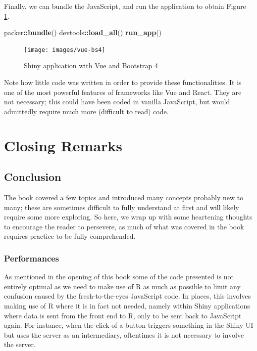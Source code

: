 \documentclass[10pt,]{krantz}
\makeatletter
\newenvironment{Shaded}{\begin{snugshade}}{\end{snugshade}}
\newcommand{\KeywordTok}[1]{\textcolor[rgb]{0.27,0.27,0.27}{\textbf{#1}}}
\newcommand{\NormalTok}[1]{#1}
\newcommand{\OperatorTok}[1]{\textcolor[rgb]{0.43,0.43,0.43}{\textbf{#1}}}
\newenvironment{kframe}{%
\medskip{}
\setlength{\fboxsep}{.8em}
 \def\at@end@of@kframe{}%
 \ifinner\ifhmode%
  \def\at@end@of@kframe{\end{minipage}}%
  \begin{minipage}{\columnwidth}%
 \fi\fi%
 \def\FrameCommand##1{\hskip\@totalleftmargin \hskip-\fboxsep
 \colorbox{shadecolor}{##1}\hskip-\fboxsep
     \hskip-\linewidth \hskip-\@totalleftmargin \hskip\columnwidth}%
 \MakeFramed {\advance\hsize-\width
   \@totalleftmargin\z@ \linewidth\hsize
   \@setminipage}}%
 {\par\unskip\endMakeFramed%
 \at@end@of@kframe}
\renewenvironment{Shaded}{\begin{kframe}}{\end{kframe}}
\makeatother
\begin{document}
Finally, we can bundle the JavaScript, and run the application to obtain Figure \ref{fig:vue-bs4}.

\begin{Shaded}
\begin{Highlighting}[]
\NormalTok{packer}\OperatorTok{::}\KeywordTok{bundle}\NormalTok{()}
\NormalTok{devtools}\OperatorTok{::}\KeywordTok{load_all}\NormalTok{()}
\KeywordTok{run_app}\NormalTok{()}
\end{Highlighting}
\end{Shaded}

\begin{figure}[H]

{\centering \texttt{[image: images/vue-bs4]} 

}

\caption{Shiny application with Vue and Bootstrap 4}\label{fig:vue-bs4}
\end{figure}

Note how little code was written in order to provide these functionalities. It is one of the most powerful features of frameworks like Vue and React. They are not necessary; this could have been coded in vanilla JavaScript, but would admittedly require much more (difficult to read) code.

\hypertarget{part-closing-remarks}{%
\part{Closing Remarks}\label{part-closing-remarks}}

\hypertarget{conclusion}{%
\chapter{Conclusion}\label{conclusion}}

The book covered a few topics and introduced many concepts probably new to many; these are sometimes difficult to fully understand at first and will likely require some more exploring. So here, we wrap up with some heartening thoughts to encourage the reader to persevere, as much of what was covered in the book requires practice to be fully comprehended.

\hypertarget{conclusion-performances}{%
\section{Performances}\label{conclusion-performances}}

As mentioned in the opening of this book some of the code presented is not entirely optimal as we need to make use of R as much as possible to limit any confusion caused by the fresh-to-the-eyes JavaScript code. In places, this involves making use of R where it is in fact not needed, namely within Shiny applications where data is sent from the front end to R, only to be sent back to JavaScript again. For instance, when the click of a button triggers something in the Shiny UI but uses the server as an intermediary, oftentimes it is not necessary to involve the server.
\end{document}
